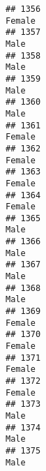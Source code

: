 \documentclass[]{article}
\begin{document}
\begin{verbatim}
## 1356                                                                                                                          Female
## 1357                                                                                                                            Male
## 1358                                                                                                                            Male
## 1359                                                                                                                            Male
## 1360                                                                                                                            Male
## 1361                                                                                                                          Female
## 1362                                                                                                                          Female
## 1363                                                                                                                          Female
## 1364                                                                                                                          Female
## 1365                                                                                                                            Male
## 1366                                                                                                                            Male
## 1367                                                                                                                            Male
## 1368                                                                                                                            Male
## 1369                                                                                                                          Female
## 1370                                                                                                                          Female
## 1371                                                                                                                          Female
## 1372                                                                                                                          Female
## 1373                                                                                                                            Male
## 1374                                                                                                                            Male
## 1375                                                                                                                            Male

\end{verbatim}
\end{document}
